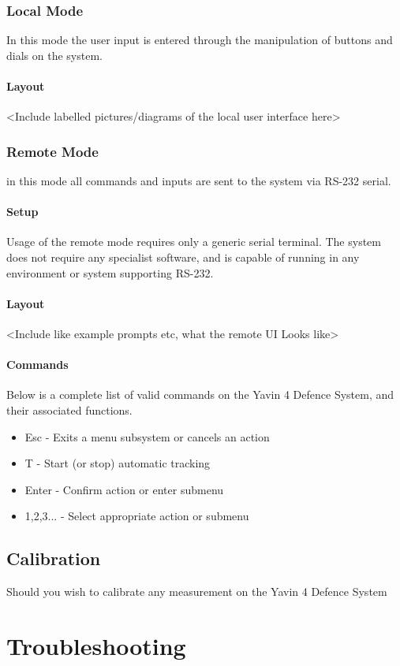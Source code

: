 \documentclass[]{report}
\begin{document}
\subsection{Local Mode}
In this mode the user input is entered through the manipulation of buttons and dials on the system.

\subsubsection{Layout}
<Include labelled pictures/diagrams of the local user interface here>

\subsection{Remote Mode}
in this mode all commands and inputs are sent to the system via RS-232 serial.

\subsubsection{Setup}
Usage of the remote mode requires only a generic serial terminal. The system does not require any specialist software, and is capable of running in any environment or system supporting RS-232.

\subsubsection{Layout}
<Include like example prompts etc, what the remote UI Looks like>

\subsubsection{Commands}
Below is a complete list of valid commands on the Yavin 4 Defence System, and their associated functions.

\begin{itemize}
	\item Esc - Exits a menu subsystem or cancels an action
	\item T - Start (or stop) automatic tracking
	\item Enter - Confirm action or enter submenu
	\item 1,2,3... - Select appropriate action or submenu
\end{itemize}

\section{Calibration}
Should you wish to calibrate any measurement on the Yavin 4 Defence System 

\chapter{Troubleshooting}
\end{document}
